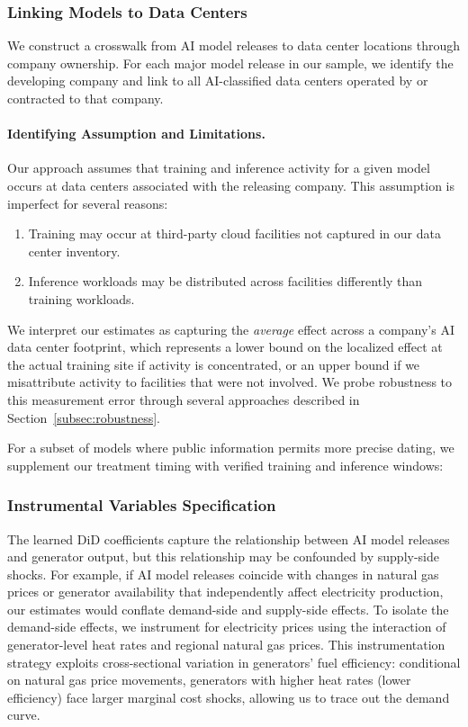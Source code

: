 \documentclass[sigconf,authordraft]{acmart}
\begin{document}
\subsubsection{Linking Models to Data Centers}

We construct a crosswalk from AI model releases to data center locations through company ownership. For each major model release in our sample, we identify the developing company and link to all AI-classified data centers operated by or contracted to that company. 

\paragraph{Identifying Assumption and Limitations.} Our approach assumes that training and inference activity for a given model occurs at data centers associated with the releasing company. This assumption is imperfect for several reasons:
\begin{enumerate}
    \item Training may occur at third-party cloud facilities not captured in our data center inventory.
    \item Inference workloads may be distributed across facilities differently than training workloads.
\end{enumerate}

We interpret our estimates as capturing the \textit{average} effect across a company's AI data center footprint, which represents a lower bound on the localized effect at the actual training site if activity is concentrated, or an upper bound if we misattribute activity to facilities that were not involved. We probe robustness to this measurement error through several approaches described in Section~\ref{subsec:robustness}.

For a subset of models where public information permits more precise dating, we supplement our treatment timing with verified training and inference windows:


\subsubsection{Instrumental Variables Specification}\label{IVDetails}

The learned DiD coefficients capture the relationship between AI model releases and generator output, but this relationship may be confounded by supply-side shocks. For example, if AI model releases coincide with changes in natural gas prices or generator availability that independently affect electricity production, our estimates would conflate demand-side and supply-side effects. To isolate the demand-side effects, we instrument for electricity prices using the interaction of generator-level heat rates and regional natural gas prices. This instrumentation strategy exploits cross-sectional variation in generators' fuel efficiency: conditional on natural gas price movements, generators with higher heat rates (lower efficiency) face larger marginal cost shocks, allowing us to trace out the demand curve.
\end{document}
